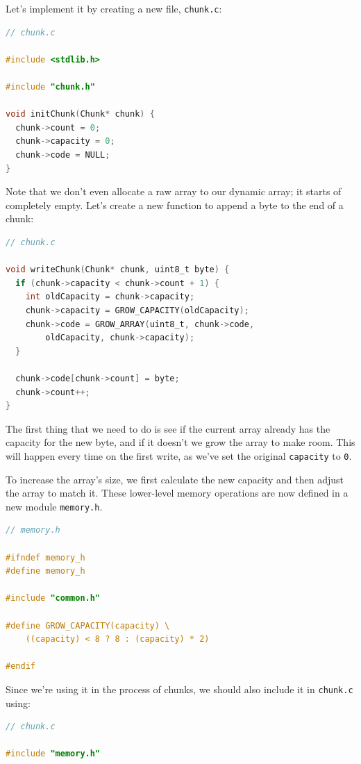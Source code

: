Let's implement it by creating a new file, \verb+chunk.c+:

\begin{lstlisting}[language=C]
// chunk.c

#include <stdlib.h>

#include "chunk.h"

void initChunk(Chunk* chunk) {
  chunk->count = 0;
  chunk->capacity = 0;
  chunk->code = NULL;
}
\end{lstlisting}

Note that we don't even allocate a raw array to our dynamic array; it starts of completely empty. Let's create a new function to append a byte to the end of a chunk:

\begin{lstlisting}[language=C]
// chunk.c

void writeChunk(Chunk* chunk, uint8_t byte) {
  if (chunk->capacity < chunk->count + 1) {
    int oldCapacity = chunk->capacity;
    chunk->capacity = GROW_CAPACITY(oldCapacity);
    chunk->code = GROW_ARRAY(uint8_t, chunk->code,
        oldCapacity, chunk->capacity);
  }

  chunk->code[chunk->count] = byte;
  chunk->count++;
}\end{lstlisting}

The first thing that we need to do is see if the current array already has the capacity for the new byte, and if it doesn't we grow the array to make room. This will happen every time on the  first write, as we've set the original \verb+capacity+ to \verb.0.. 

To increase the array's size, we first calculate the new capacity and then adjust the array to match it. These lower-level memory operations are now defined in a new module \verb+memory.h+.

\begin{lstlisting}[language=C]
// memory.h

#ifndef memory_h
#define memory_h

#include "common.h"

#define GROW_CAPACITY(capacity) \
    ((capacity) < 8 ? 8 : (capacity) * 2)

#endif
\end{lstlisting}

Since we're using it in the process of chunks, we should also include it in \verb+chunk.c+ using:

\begin{lstlisting}[language=C]
// chunk.c

#include "memory.h"
\end{lstlisting}

